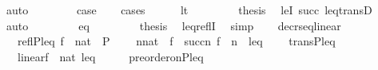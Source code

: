 \begin{isabellebody}
\ auto\isanewline
\ \ \isamarkupfalse%
\ \isanewline
\ \ \isamarkupfalse%
\ {\isacharquery}{\kern0pt}case\ \isanewline
\ \ \isamarkupfalse%
{\isacharparenleft}{\kern0pt}cases{\isacharparenright}{\kern0pt}\isanewline
\ \ \ \ \isamarkupfalse%
\ lt\isanewline
\ \ \ \ \isamarkupfalse%
\ {}\ \isamarkupfalse%
\ {\isacharquery}{\kern0pt}thesis\ \isamarkupfalse%
\ leI\ succ\ leq{\isacharunderscore}{\kern0pt}transD\ \isamarkupfalse%
\ auto\isanewline
\ \ \isamarkupfalse%
\isanewline
\ \ \ \ \isamarkupfalse%
\ eq\isanewline
\ \ \ \ \isamarkupfalse%
\ {}\ \isamarkupfalse%
\ {\isacharquery}{\kern0pt}thesis\ \isamarkupfalse%
\ leq{\isacharunderscore}{\kern0pt}reflI\ \isamarkupfalse%
\ simp\isanewline
\ \ \isamarkupfalse%
\isanewline
{}\isamarkupfalse%
%
\endisatagproof
{\isafoldproof}%
%
\isadelimproof
\isanewline
%
\endisadelimproof
\isanewline
{}\isamarkupfalse%
\ decr{\isacharunderscore}{\kern0pt}seq{\isacharunderscore}{\kern0pt}linear{\isacharcolon}{\kern0pt}\ \isanewline
\ \ \ {\isachardoublequoteopen}refl{\isacharparenleft}{\kern0pt}P{\isacharcomma}{\kern0pt}leq{\isacharparenright}{\kern0pt}{\isachardoublequoteclose}\ {\isachardoublequoteopen}f\ {\isasymin}\ nat\ {\isasymrightarrow}\ P{\isachardoublequoteclose}\isanewline
\ \ \ \ {\isachardoublequoteopen}{\isasymforall}n{\isasymin}nat{\isachardot}{\kern0pt}\ \ {\isasymlangle}f\ {\isacharbackquote}{\kern0pt}\ succ{\isacharparenleft}{\kern0pt}n{\isacharparenright}{\kern0pt}{\isacharcomma}{\kern0pt}\ f\ {\isacharbackquote}{\kern0pt}\ n{\isasymrangle}\ {\isasymin}\ leq{\isachardoublequoteclose}\isanewline
\ \ \ \ {\isachardoublequoteopen}trans{\isacharbrackleft}{\kern0pt}P{\isacharbrackright}{\kern0pt}{\isacharparenleft}{\kern0pt}leq{\isacharparenright}{\kern0pt}{\isachardoublequoteclose}\isanewline
\ \ \ {\isachardoublequoteopen}linear{\isacharparenleft}{\kern0pt}f\ {\isacharbackquote}{\kern0pt}{\isacharbackquote}{\kern0pt}\ nat{\isacharcomma}{\kern0pt}\ leq{\isacharparenright}{\kern0pt}{\isachardoublequoteclose}\isanewline
%
\isadelimproof
%
\endisadelimproof
%
\isatagproof
{}\isamarkupfalse%
\ {\isacharminus}{\kern0pt}\isanewline
\ \ \isamarkupfalse%
\ {\isachardoublequoteopen}preorder{\isacharunderscore}{\kern0pt}on{\isacharparenleft}{\kern0pt}P{\isacharcomma}{\kern0pt}leq{\isacharparenright}{\kern0pt}{\isachardoublequoteclose}\ \isanewline

\end{isabellebody}
